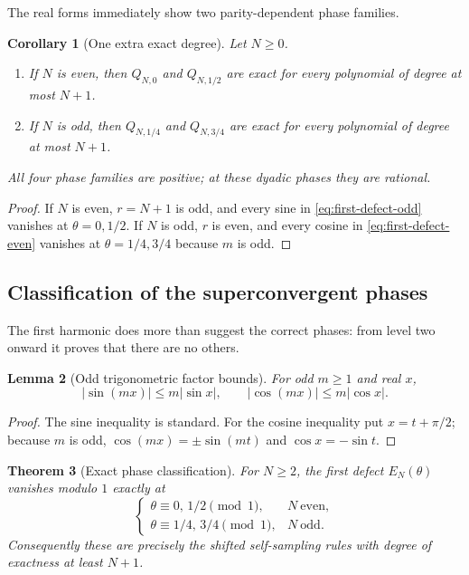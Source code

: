 \documentclass[11pt]{article}
\numberwithin{equation}{section}
\newtheorem{theorem}{Theorem}[section]
\newtheorem{lemma}[theorem]{Lemma}
\newtheorem{corollary}[theorem]{Corollary}
\theoremstyle{definition}
\theoremstyle{remark}
\newcommand{\abs}[1]{\left|#1\right|}
\begin{document}
The real forms immediately show two parity-dependent phase families.

\begin{corollary}[One extra exact degree]
\label{cor:forced-superconvergence}
Let $N\ge0$.
\begin{enumerate}
\item If $N$ is even, then $Q_{N,0}$ and $Q_{N,1/2}$ are exact for every polynomial of degree at most $N+1$.
\item If $N$ is odd, then $Q_{N,1/4}$ and $Q_{N,3/4}$ are exact for every polynomial of degree at most $N+1$.
\end{enumerate}
All four phase families are positive; at these dyadic phases they are rational.
\end{corollary}

\begin{proof}
If $N$ is even, $r=N+1$ is odd, and every sine in \eqref{eq:first-defect-odd} vanishes at $\theta=0,1/2$.  If $N$ is odd, $r$ is even, and every cosine in \eqref{eq:first-defect-even} vanishes at $\theta=1/4,3/4$ because $m$ is odd.
\end{proof}

\subsection{Classification of the superconvergent phases}

The first harmonic does more than suggest the correct phases: from level two onward it proves that there are no others.

\begin{lemma}[Odd trigonometric factor bounds]
\label{lem:odd-trig-factor}
For odd $m\ge1$ and real $x$,
\begin{equation}
 \abs{\sin(mx)}\le m\abs{\sin x},
 \qquad
 \abs{\cos(mx)}\le m\abs{\cos x}.
 \label{eq:odd-trig-factor}
\end{equation}
\end{lemma}

\begin{proof}
The sine inequality is standard.  For the cosine inequality put $x=t+\pi/2$; because $m$ is odd, $\cos(mx)=\pm\sin(mt)$ and $\cos x=-\sin t$.
\end{proof}

\begin{theorem}[Exact phase classification]
\label{thm:phase-classification}
For $N\ge2$, the first defect $E_N(\theta)$ vanishes modulo $1$ exactly at
\begin{equation}
 \begin{cases}
 \theta\equiv0,\,1/2\pmod1,&N\ \text{even},\\
 \theta\equiv1/4,\,3/4\pmod1,&N\ \text{odd}.
 \end{cases}
 \label{eq:phase-classification}
\end{equation}
Consequently these are precisely the shifted self-sampling rules with degree of exactness at least $N+1$.
\end{theorem}
\end{document}
